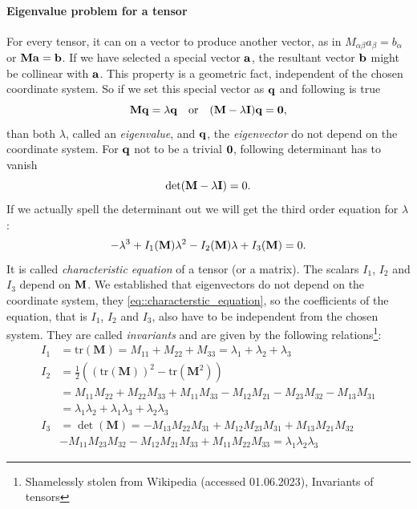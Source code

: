 \documentclass[a4paper]{article}
\begin{document}
\paragraph{Eigenvalue problem for a tensor}
For every tensor, it can  on a vector to produce another vector, as
in \(M_{\alpha\beta}a_\beta = b_\alpha\) or \(\vb{M}\vb{a} = \vb{b}\). If we
have selected a special vector \(\vb{a}\), the resultant vector \(\vb{b}\)
might be collinear with \(\vb{a}\). This property is a geometric fact,
independent of the chosen coordinate system. So if we set this special
vector as \(\vb{q}\) and following is true
\[
	\vb{M}\vb{q} = \lambda\vb{q} \quad \text{or} \quad
	\qty(\vb{M} - \lambda\vb{I})\vb{q} = \vb{0},
\]
than both \(\lambda\), called an \emph{eigenvalue}, and \(\vb{q}\), the
\emph{eigenvector} do not depend on the coordinate system.
For \(\vb{q}\) not to be a trivial \(\vb{0}\), following determinant has to
vanish
\[
	\det(\vb{M} - \lambda\vb{I}) = 0.
\]
If we actually spell the determinant out we will get the third order
equation for \(\lambda\):
\begin{equation}\label{eq::characterstic_equation}
	-\lambda^3 + I_1 \qty(\vb{M})\lambda^2 - I_2\qty(\vb{M})\lambda
	+ I_3\qty(\vb{M}) = 0.
\end{equation}
It is called \emph{characteristic equation} of a tensor (or a matrix). The
scalars \(I_1\), \(I_2\) and \(I_3\) depend on \(\vb{M}\). We established
that eigenvectors do not depend on the coordinate system, they 
\autoref{eq::characterstic_equation}, so the coefficients of the equation,
that is \(I_1\), \(I_2\) and \(I_3\), also have to be independent from the
chosen system. They are called \emph{invariants} and are given by the
following relations\footnote{Shamelessly stolen from Wikipedia (accessed
	01.06.2023), Invariants of tensors}:
\begin{align*}
	I_1 & = \mathrm{tr}(\mathbf{M}) = M_{11}+M_{22}+M_{33} = \lambda_1+\lambda_2+\lambda_3                       \\
	I_2 & = \frac{1}{2} \left( (\mathrm{tr}(\mathbf{M}))^2-\mathrm{tr} \left( \mathbf{M}^2 \right) \right)       \\
	    & = M_{11}M_{22}+M_{22}M_{33}+M_{11}M_{33}-M_{12}M_{21}-M_{23}M_{32}-M_{13}M_{31}                        \\
	    & = \lambda_1 \lambda_2 + \lambda_1 \lambda_3 + \lambda_2 \lambda_3                                      \\
	I_3 & = \det (\mathbf{M}) = -M_{13} M_{22} M_{31} + M_{12} M_{23} M_{31} + M_{13} M_{21} M_{32}              \\
	    & - M_{11} M_{23} M_{32} - M_{12} M_{21} M_{33} +   M_{11} M_{22} M_{33} = \lambda_1 \lambda_2 \lambda_3
\end{align*}
\end{document}

